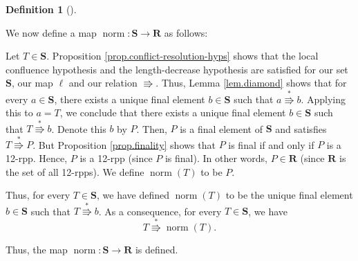 \documentclass[numbers=enddot,12pt,final,onecolumn,notitlepage]{scrartcl}%
\theoremstyle{definition}
\newtheorem{defi}[theo]{Definition}
\newenvironment{definition}[1][]
{\begin{defi}[#1]\begin{leftbar}}
{\end{leftbar}\end{defi}}
\begin{document}
\begin{definition}
We now define a map $\operatorname*{norm}:\mathbf{S}\rightarrow\mathbf{R}$ as follows:

Let $T\in\mathbf{S}$. Proposition \ref{prop.conflict-resolution-hyps} shows
that the local confluence hypothesis and the length-decrease hypothesis are
satisfied for our set $\mathbf{S}$, our map $\ell$ and our relation
$\Rrightarrow$. Thus, Lemma \ref{lem.diamond} shows that for every
$a\in\mathbf{S}$, there exists a unique final element $b\in\mathbf{S}$ such
that $a\overset{\ast}{\Rrightarrow}b$. Applying this to $a=T$, we conclude
that there exists a unique final element $b\in\mathbf{S}$ such that
$T\overset{\ast}{\Rrightarrow}b$. Denote this $b$ by $P$. Then, $P$ is a final
element of $\mathbf{S}$ and satisfies $T\overset{\ast}{\Rrightarrow}P$. But
Proposition \ref{prop.finality} shows that $P$ is final if and only if $P$ is
a 12-rpp. Hence, $P$ is a 12-rpp (since $P$ is final). In other words,
$P\in\mathbf{R}$ (since $\mathbf{R}$ is the set of all 12-rpps). We define
$\operatorname*{norm}\left(  T\right)  $ to be $P$.

Thus, for every $T\in\mathbf{S}$, we have defined $\operatorname*{norm}\left(
T\right)  $ to be the unique final element $b\in\mathbf{S}$ such that
$T\overset{\ast}{\Rrightarrow}b$. As a consequence, for every $T\in\mathbf{S}%
$, we have
\begin{equation}
T\overset{\ast}{\Rrightarrow}\operatorname*{norm}\left(  T\right)  .
\label{pf.lem.BK.norm.=>}%
\end{equation}


Thus, the map $\operatorname*{norm}:\mathbf{S}\rightarrow\mathbf{R}$ is defined.
\end{definition}
\end{document}
